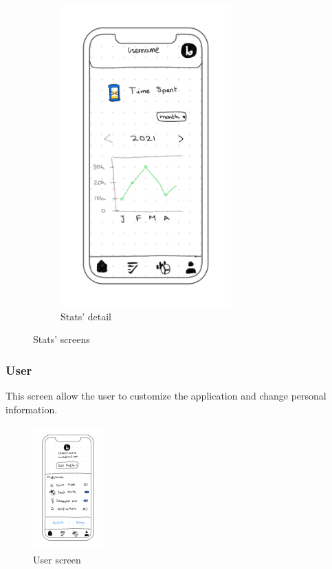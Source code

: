 \begin{figure}[H]
\begin{subfigure}[T]{0.32\textwidth}
        \includegraphics[width=0.72\textwidth]{assets/screens/stats/Stats - 3.png}
        \caption{Stats' detail}
        \label{fig:design_screen_stats_3}
    \end{subfigure}
       \caption{Stats' screens}
       \label{fig:design_screen_stats}
\end{figure}

\subsubsection{User}
This screen allow the user to customize the application and change personal information. \\
\begin{figure}[H]
    \centering
        \includegraphics[width=0.24\textwidth]{assets/screens/User.png}
    \caption{User screen}
    \label{fig:design_user}
\end{figure}

